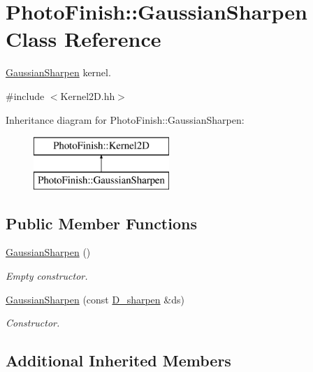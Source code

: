 \hypertarget{class_photo_finish_1_1_gaussian_sharpen}{}\section{Photo\+Finish\+:\+:Gaussian\+Sharpen Class Reference}
\label{class_photo_finish_1_1_gaussian_sharpen}


\hyperlink{class_photo_finish_1_1_gaussian_sharpen}{Gaussian\+Sharpen} kernel.  




{\ttfamily \#include $<$Kernel2\+D.\+hh$>$}

Inheritance diagram for Photo\+Finish\+:\+:Gaussian\+Sharpen\+:\begin{figure}[H]
\begin{center}
\leavevmode
\includegraphics[height=2.000000cm]{class_photo_finish_1_1_gaussian_sharpen}
\end{center}
\end{figure}
\subsection*{Public Member Functions}
\begin{DoxyCompactItemize}
\item 
\hyperlink{class_photo_finish_1_1_gaussian_sharpen_aee3963e9acb80f4243a7eb048a56d03a}{Gaussian\+Sharpen} ()
\begin{DoxyCompactList}\small\item\em Empty constructor. \end{DoxyCompactList}\item 
\hyperlink{class_photo_finish_1_1_gaussian_sharpen_a71b8726201f26eb9b290f1edb37c4c5d}{Gaussian\+Sharpen} (const \hyperlink{class_photo_finish_1_1_d__sharpen}{D\+\_\+sharpen} \&ds)
\begin{DoxyCompactList}\small\item\em Constructor. \end{DoxyCompactList}\end{DoxyCompactItemize}
\subsection*{Additional Inherited Members}


